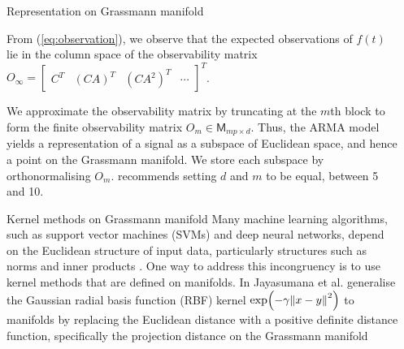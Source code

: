 \documentclass[final]{beamer}
\newlength{\sepwid}
\newlength{\onecolwid}
\newcommand{\lbr}{\vspace{0.5in}}
\begin{document}
\begin{frame}[t]
\begin{columns}[t]
\begin{column}{\sepwid}\end{column} %

\begin{column}{\onecolwid} %


\begin{block}{Representation on Grassmann manifold}

    From (\ref{eq:observation}), we observe that the expected observations of $f(t)$ lie in the
    column space of the observability matrix $O_\infty = \begin{bmatrix} C^T & (CA)^T & (CA^2)^T &
    \cdots \end{bmatrix}^T$. \lbr

    We approximate the observability matrix by truncating at the $m$th block to form the
    finite observability matrix $O_m \in \mathsf{M}_{mp \times d}$.  Thus, the ARMA model yields a
    representation of a signal as a subspace of Euclidean space, and hence a point on the Grassmann
    manifold. We store each subspace by orthonormalising $O_m$. \cite{turaga_statistical_2011}
    recommends setting $d$ and $m$ to be equal, between 5 and 10.
\end{block}


\begin{block}{Kernel methods on Grassmann manifold}
    Many machine learning algorithms, such as support vector machines (SVMs) and deep neural
    networks, depend on the Euclidean structure of input data, particularly structures such as norms
    and inner products \cite{jayasumana_kernel_2015}. One way to address this incongruency is to use
    kernel methods that are defined on manifolds. In \cite{jayasumana_kernel_2015} Jayasumana et al.
    generalise the Gaussian radial basis function (RBF) kernel $\exp(-\gamma \norm{x - y}^2)$ to
    manifolds by replacing the Euclidean distance with a positive definite distance function,
    specifically the projection distance on the Grassmann manifold


\end{block}
\end{column}
\end{columns}
\end{frame}
\end{document}
